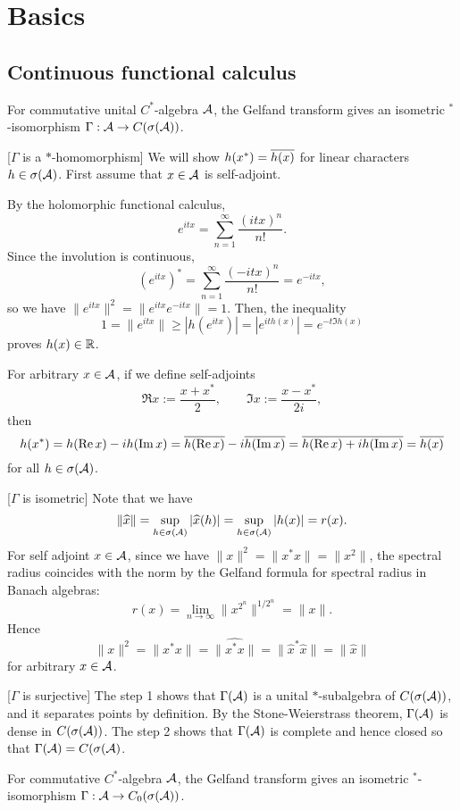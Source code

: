 \documentclass{../exp}
\begin{document}
\section{Basics}
\subsection{Continuous functional calculus}
\begin{thm}
For commutative unital $C^*$-algebra $\mathcal{A}$, the Gelfand transform gives an isometric $^*$-isomorphism $\Gamma:\cA\to C(\sigma(\cA))$.
\end{thm}
\begin{pf}
[$\Gamma$ is a $*$-homomorphism]
We will show $h(x^*)=\overline{h(x)}$ for linear characters $h\in\sigma(\mathcal{A})$.
First assume that $x\in\mathcal{A}$ is self-adjoint.

By the holomorphic functional calculus,
\[e^{itx}=\sum_{n=1}^\infty\frac{(itx)^n}{n!}.\]
Since the involution is continuous,
\[(e^{itx})^*=\sum_{n=1}^\infty\frac{(-itx)^n}{n!}=e^{-itx},\]
so we have $\|e^{itx}\|^2=\|e^{itx}e^{-itx}\|=1$.
Then, the inequality
\[1=\|e^{itx}\|\ge|h(e^{itx})|=|e^{ith(x)}|=e^{-t\Im h(x)}\]
proves $h(x)\in\mathbb{R}$.

For arbitrary $x\in\mathcal{A}$, if we define self-adjoints
\[\Re x:=\frac{x+x^*}2,\qquad\Im x:=\frac{x-x^*}{2i},\]
then
\[h(x^*)=h(\operatorname{Re} x)-ih(\operatorname{Im} x)=\overline{h(\operatorname{Re} x)}-i\overline{h(\operatorname{Im} x)}=\overline{h(\operatorname{Re} x)+ih(\operatorname{Im} x)}=\overline{h(x)}\]
for all $h\in\sigma(\mathcal{A})$.

[$\Gamma$ is isometric]
Note that we have
\[\|\widehat x\|=\sup_{h\in\sigma(\mathcal{A})}|\widehat x(h)|=\sup_{h\in\sigma(\mathcal{A})}|h(x)|=r(x).\]
For self adjoint $x\in\mathcal{A}$, since we have $\|x\|^2=\|x^*x\|=\|x^2\|$, the spectral radius coincides with the norm by the Gelfand formula for spectral radius in Banach algebras:
\[r(x)=\lim_{n\to\infty}\|x^{2^n}\|^{1/2^n}=\|x\|.\]
Hence
\[\|x\|^2=\|x^*x\|=\|\hat{x^*x}\|=\|\hat{x}^*\hat{x}\|=\|\hat{x}\|\]
for arbitrary $x\in\mathcal{A}$.

[$\Gamma$ is surjective]
The step 1 shows that $\Gamma(\mathcal{A})$ is a unital $*$-subalgebra of $C(\sigma(\mathcal{A}))$, and it separates points by definition.
By the Stone-Weierstrass theorem, $\Gamma(\mathcal{A})$ is dense in $C(\sigma(\mathcal{A}))$.
The step 2 shows that $\Gamma(\mathcal{A})$ is complete and hence closed so that $\Gamma(\mathcal{A})=C(\sigma(\mathcal{A})$.
\end{pf}
\begin{thm}
For commutative $C^*$-algebra $\mathcal{A}$, the Gelfand transform gives an isometric $^*$-isomorphism $\Gamma:\cA\to C_0(\sigma(\cA))$.
\end{thm}
\end{document}
